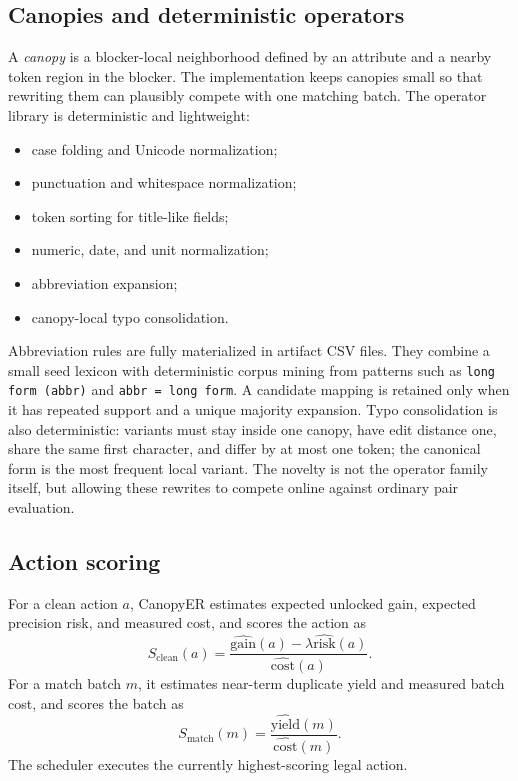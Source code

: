 \documentclass{article}
\newcommand{\method}{CanopyER}
\begin{document}
\subsection{Canopies and deterministic operators}

A \emph{canopy} is a blocker-local neighborhood defined by an attribute and a nearby token region in the blocker. The implementation keeps canopies small so that rewriting them can plausibly compete with one matching batch. The operator library is deterministic and lightweight:
\begin{itemize}
  \item case folding and Unicode normalization;
  \item punctuation and whitespace normalization;
  \item token sorting for title-like fields;
  \item numeric, date, and unit normalization;
  \item abbreviation expansion;
  \item canopy-local typo consolidation.
\end{itemize}

Abbreviation rules are fully materialized in artifact CSV files. They combine a small seed lexicon with deterministic corpus mining from patterns such as \texttt{long form (abbr)} and \texttt{abbr = long form}. A candidate mapping is retained only when it has repeated support and a unique majority expansion. Typo consolidation is also deterministic: variants must stay inside one canopy, have edit distance one, share the same first character, and differ by at most one token; the canonical form is the most frequent local variant. The novelty is not the operator family itself, but allowing these rewrites to compete online against ordinary pair evaluation.

\subsection{Action scoring}

For a clean action $a$, \method{} estimates expected unlocked gain, expected precision risk, and measured cost, and scores the action as
\[
S_{\text{clean}}(a)=\frac{\widehat{\mathrm{gain}}(a)-\lambda \widehat{\mathrm{risk}}(a)}{\widehat{\mathrm{cost}}(a)}.
\]
For a match batch $m$, it estimates near-term duplicate yield and measured batch cost, and scores the batch as
\[
S_{\text{match}}(m)=\frac{\widehat{\mathrm{yield}}(m)}{\widehat{\mathrm{cost}}(m)}.
\]
The scheduler executes the currently highest-scoring legal action.
\end{document}
